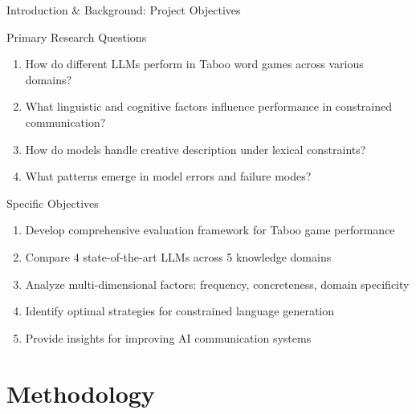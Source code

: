 \documentclass[aspectratio=169]{beamer}
\begin{document}
\begin{frame}{Introduction \& Background: Project Objectives}
\begin{block}{Primary Research Questions}
\begin{enumerate}
    \item How do different LLMs perform in Taboo word games across various domains?
    \item What linguistic and cognitive factors influence performance in constrained communication?
    \item How do models handle creative description under lexical constraints?
    \item What patterns emerge in model errors and failure modes?
\end{enumerate}
\end{block}

\begin{block}{Specific Objectives}
\begin{enumerate}
    \item Develop comprehensive evaluation framework for Taboo game performance
    \item Compare 4 state-of-the-art LLMs across 5 knowledge domains
    \item Analyze multi-dimensional factors: frequency, concreteness, domain specificity
    \item Identify optimal strategies for constrained language generation
    \item Provide insights for improving AI communication systems
\end{enumerate}
\end{block}
\end{frame}

\section{Methodology}
\end{document}
